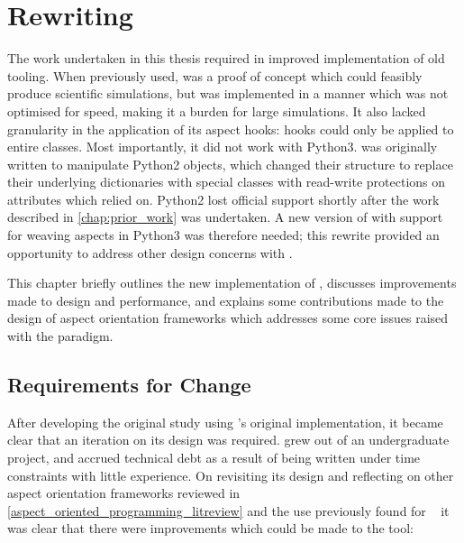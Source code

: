 \chapter{Rewriting \pdsf{}}\label{chap:pdsf_rewrite}




The work undertaken in this thesis required in improved implementation of old
tooling. When previously used, \pdsf{} was a proof of concept which could
feasibly produce scientific simulations, but was implemented in a manner which
was not optimised for speed, making it a burden for large simulations. It also
lacked granularity in the application of its aspect hooks: hooks could only be
applied to entire classes. Most importantly, it did not work with Python3.
\pdsf{} was originally written to manipulate Python2 objects, which changed
their structure to replace their underlying dictionaries with special classes
with read-write protections on attributes which \pdsf{} relied on. Python2
lost official support shortly after the work described in \cref{chap:prior_work}
was undertaken. A new version of \pdsf{} with support for weaving aspects in
Python3 was therefore needed; this rewrite provided an opportunity to address
other design concerns with \pdsf{}.

This chapter briefly outlines the new implementation of \pdsf{}, discusses
improvements made to design and performance, and explains some contributions
made to the design of aspect orientation frameworks which addresses some core
issues raised with the paradigm. 


\section{Requirements for Change}\label{sec:pdsf3requirements}

After developing the original study using \pdsf{}'s original implementation, it
became clear that an iteration on its design was required. \pdsf{} grew out of
an undergraduate project, and accrued technical debt as a result of being
written under time constraints with little experience. On revisiting its design
and reflecting on other aspect orientation frameworks reviewed in  
\cref{aspect_oriented_programming_litreview} and the use previously found for
\pdsf{}~\cite{wallis2018caise,wallis2018genetic} it was clear that there were
improvements which could be made to the tool:

